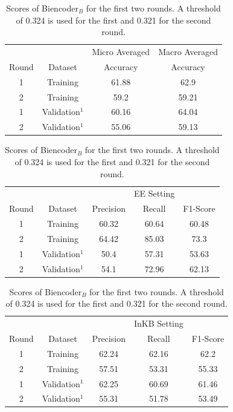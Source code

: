 \documentclass{report}
\theoremstyle{definition}
\theoremstyle{remark}
\begin{document}
\begin{table}
    \centering
    \begin{tabular}{cccc}
    &&Micro Averaged & Macro Averaged\\
    Round    & Dataset & Accuracy &Accuracy \\
    \hline
    1  & Training & 61.88&62.9\\
    2  & Training & 59.2&	59.21\\
    1  & Validation$^1$ & 60.16	&64.04\\
    2  & Validation$^1$ & 55.06	&59.13\\
    \end{tabular}
    
    \vspace{0.5cm}\begin{tabular}{ccccc}
    &&&EE Setting & \\
    Round    & Dataset & Precision & Recall & F1-Score \\
    \hline
    1  & Training &60.32&	60.64&	60.48 \\
    2  & Training &64.42&	85.03&	73.3 \\
    1  & Validation$^1$ &50.4&	57.31&	53.63 \\
    2  & Validation$^1$ &54.1&	72.96&	62.13\\
    \end{tabular}
    
    \vspace{0.5cm}\begin{tabular}{ccccc}
    &&&InKB Setting & \\
    Round    & Dataset & Precision & Recall & F1-Score \\
    \hline
    1  & Training &62.24&62.16	&62.2\\
    2  & Training &57.51&53.31	&55.33\\
    1  & Validation$^1$ &62.25&60.69	&61.46 \\
    2  & Validation$^1$ &55.31&51.78	&53.49\\
    \end{tabular}
    
    \caption{Scores of Biencoder$_B$ for the first two rounds. A threshold of 0.324 is used for the first and 0.321 for the second round.}
    \label{tab:biencoderbres}
\end{table}
\end{document}
